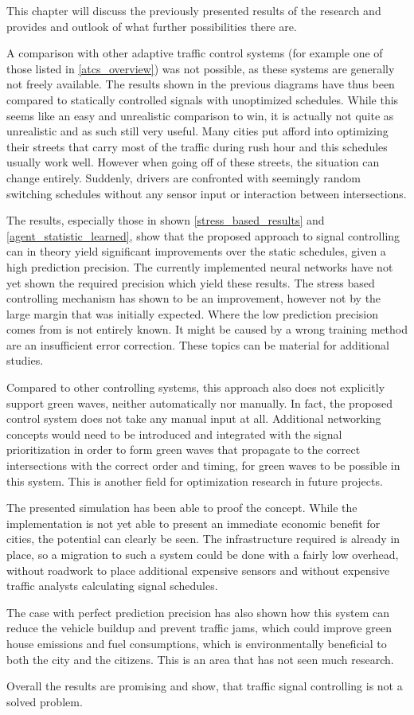 This chapter will discuss the previously presented results of the research and provides and outlook of what further possibilities there are.

A comparison with other adaptive traffic control systems (for example one of those listed in \autoref{atcs_overview}) was not possible, as these systems are generally not freely available. The results shown in the previous diagrams have thus been compared to statically controlled signals with unoptimized schedules. While this seems like an easy and unrealistic comparison to win, it is actually not quite as unrealistic and as such still very useful. Many cities put afford into optimizing their streets  that carry most of the traffic during rush hour and this schedules usually work well. However when going off of these streets, the situation can change entirely. Suddenly, drivers are confronted with seemingly random switching schedules without any sensor input or interaction between intersections.

The results, especially those in shown \autoref{stress_based_results} and \autoref{agent_statistic_learned}, show that the proposed approach to signal controlling can in theory yield significant improvements over the static schedules, given a high prediction precision. The currently implemented neural networks have not yet shown the required precision which yield these results. The stress based controlling mechanism has shown to be an improvement, however not by the large margin that was initially expected. Where the low prediction precision comes from is not entirely known. It might be caused by a wrong training method are an insufficient error correction. These topics can be material for additional studies.

Compared to other controlling systems, this approach also does not explicitly support green waves, neither automatically nor manually. In fact, the proposed control system does not take any manual input at all. Additional networking concepts would need to be introduced and integrated with the signal prioritization in order to form green waves that propagate to the correct intersections with the correct order and timing, for green waves to be possible in this system. This is another field for optimization research in future projects.

The presented simulation has been able to proof the concept. While the implementation is not yet able to present an immediate economic benefit for cities, the potential can clearly be seen. The infrastructure required is already in place, so a migration to such a system could be done with a fairly low overhead, without roadwork to place additional expensive sensors and without expensive traffic analysts calculating signal schedules.

The case with perfect prediction precision has also shown how this system can reduce the vehicle buildup and prevent traffic jams, which could improve green house emissions and fuel consumptions, which is environmentally beneficial to both the city and the citizens. This is an area that has not seen much research.

Overall the results are promising and show, that traffic signal controlling is not a solved problem.